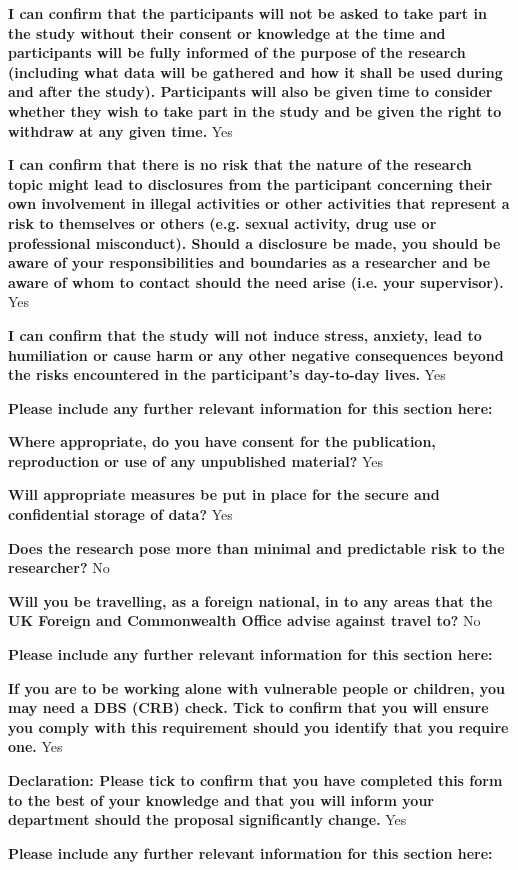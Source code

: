 \noindent \textbf{I can confirm that the participants will not be asked to take part in the study without their consent or knowledge at the time and participants will be fully informed of the purpose of the research (including what data will be gathered and how it shall be used during and after the study). Participants will also be given time to consider whether they wish to take part in the study and be given the right to withdraw at any given time.}
Yes

\noindent \textbf{I can confirm that there is no risk that the nature of the research topic might lead to disclosures from the participant concerning their own involvement in illegal activities or other activities that represent a risk to themselves or others (e.g. sexual activity, drug use or professional misconduct). Should a disclosure be made, you should be aware of your responsibilities and boundaries as a researcher and be aware of whom to contact should the need arise (i.e. your supervisor).}
Yes

\noindent \textbf{I can confirm that the study will not induce stress, anxiety, lead to humiliation or cause harm or any other negative consequences beyond the risks encountered in the participant’s day-to-day lives.}
Yes

\noindent \textbf{Please include any further relevant information for this section here:}

\noindent \textbf{Where appropriate, do you have consent for the publication, reproduction or use of any unpublished material?}
Yes

\noindent \textbf{Will appropriate measures be put in place for the secure and confidential storage of data?}
Yes

\noindent \textbf{Does the research pose more than minimal and predictable risk to the researcher?}
No

\noindent \textbf{Will you be travelling, as a foreign national, in to any areas that the UK Foreign and Commonwealth Office advise against travel to?}
No

\noindent \textbf{Please include any further relevant information for this section here:}

\noindent \textbf{If you are to be working alone with vulnerable people or children, you may need a DBS (CRB) check. Tick to confirm that you will ensure you comply with this requirement should you identify that you require one.}
Yes

\noindent \textbf{Declaration: Please tick to confirm that you have completed this form to the best of your knowledge and that you will inform your department should the proposal significantly change.}
Yes

\noindent \textbf{Please include any further relevant information for this section here:}

\fi
